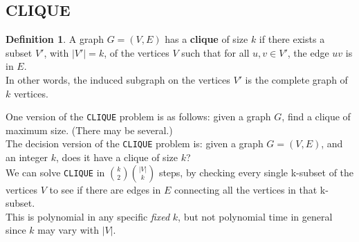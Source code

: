 \documentclass[12pt]{article}
\theoremstyle{plain}
\theoremstyle{definition}
\newtheorem*{defn*}{Definition}
\begin{document}
\subsection{CLIQUE}
\begin{defn*}
A graph $G = (V, E)$ has a \textbf{clique} of size $k$ if there exists a subset $V'$, with $|V'| = k$, of the vertices $V$ such that for all $u, v \in V'$, the edge $uv$ is in $E$. \\
In other words, the induced subgraph on the vertices $V'$ is the complete graph of $k$ vertices.
\end{defn*}

One version of the \texttt{CLIQUE} problem is as follows: given a graph $G$, find a clique of maximum size. (There may be several.) \\

The decision version of the \texttt{CLIQUE} problem is: given a graph $G = (V, E)$, and an integer $k$, does it have a clique of size $k$? \\

We can solve \texttt{CLIQUE} in ${k \choose 2}{|V| \choose k}$ steps, by checking every single k-subset of the vertices $V$ to see if there are edges in $E$ connecting all the vertices in that k-subset. \\
This is polynomial in any specific \emph{fixed} $k$, but not polynomial time in general since $k$ may vary with $|V|$.
\end{document}
